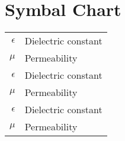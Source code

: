 

\clearpage


{\Huge\centering\section*{Symbal Chart}}

\label{chap:symb}
    
\begin{longtable}{rl}
    $\epsilon$  & Dielectric constant  \\  
    $\mu$       & Permeability  \\
    $\epsilon$  & Dielectric constant   \\
    $\mu$       & Permeability  \\
    $\epsilon$  & Dielectric constant   \\
    $\mu$       & Permeability   \\

\end{longtable}
    
